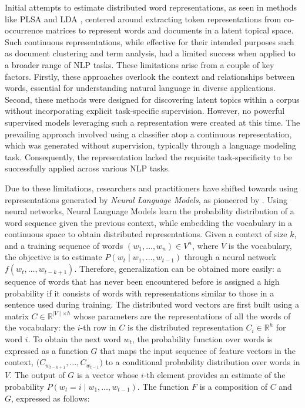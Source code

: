 Initial attempts to estimate distributed word representations, as seen in methods like \ac{PLSA} \citep{hofmann2001unsupervised} and \ac{LDA} \citep{blei2003latent}, centered around extracting token representations from co-occurrence matrices to represent words and documents in a latent topical space. Such continuous representations, while effective for their intended purposes such as document clustering and term analysis, had a limited success when applied to a broader range of \ac{NLP} tasks. These limitations arise from a couple of key factors. Firstly, these approaches overlook the context and relationships between words, essential for understanding natural language in diverse applications. Second, these methods were designed for discovering latent topics within a corpus without incorporating explicit task-specific supervision. However, no powerful supervised models leveraging such a representation were created at this time. The prevailing approach involved using a classifier atop a continuous representation, which was generated without supervision, typically through a language modeling task. Consequently, the representation lacked the requisite task-specificity to be successfully applied across various \ac{NLP} tasks.

Due to these limitations, researchers and practitioners have shifted towards using representations generated by \textit{Neural Language Models}, as pioneered by \citet{bengio2000neural}. Using neural networks, Neural Language Models learn the probability distribution of a word sequence given the previous context, while embedding the vocabulary in a continuous space to obtain distributed representations. Given a context of size $k$, and a training sequence of words $(w_1, \ldots, w_n) \in V^n$, where $V$ is the vocabulary, the objective is to estimate $P(w_t \mid w_1, \ldots, w_{t-1})$ through a neural network $f(w_t, \ldots, w_{t-k+1})$. Therefore, generalization can be obtained more easily: a sequence of words that has never been encountered before is assigned a high probability if it consists of words with representations similar to those in a sentence used during training. 
The distributed word vectors are first built using a matrix $C \in \mathbb{R}^{\mid V \mid \times h}$ whose parameters are the representations of all the words of the vocabulary: the $i$-th row in $C$ is the distributed representation $C_i \in \mathbb{R}^h$ for word $i$. To obtain the next word $w_t$, the probability function over words is expressed as a function $G$ that maps the input sequence of feature vectors in the context, $\bigl(C_{w_{t-k+1}}, \ldots, C_{w_{t-1}}\bigr)$ to a conditional probability distribution over words in $V$. The output of $G$ is a vector whose $i$-th element provides an estimate of the probability $P(w_t = i \mid w_1, \ldots, w_{t-1})$. The function $F$ is a composition of $C$ and $G$, expressed as follows:

